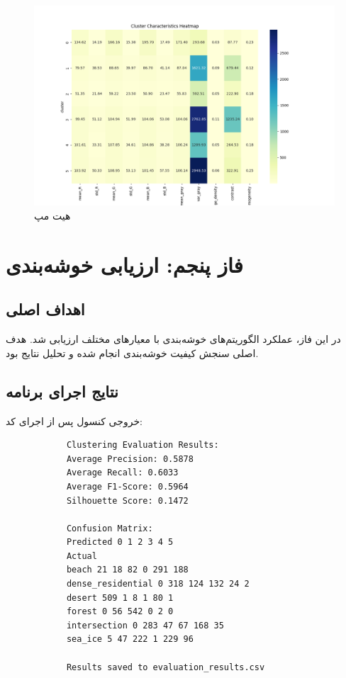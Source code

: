\documentclass[a4paper,12pt]{article}
\let\nobreaksection\section
\renewcommand{\section}{\nobreaksection}
\begin{document}
\clearpage
\begin{figure}[h]
\centering
\includegraphics[width=\textwidth]{cluster_characteristics.png}
\caption{هیت مپ}
\label{fig:hitmap}
\end{figure}

	\section{فاز پنجم: ارزیابی خوشه‌بندی}
	
	\subsection*{\textbf{اهداف اصلی}}
	در این فاز، عملکرد الگوریتم‌های خوشه‌بندی با معیارهای مختلف ارزیابی شد. هدف اصلی سنجش کیفیت خوشه‌بندی انجام شده و تحلیل نتایج بود.
	\subsection*{\textbf{نتایج اجرای برنامه}}
	خروجی کنسول پس از اجرای کد:
	
	\begin{latin}
		\begin{verbatim}
			Clustering Evaluation Results:
			Average Precision: 0.5878
			Average Recall: 0.6033
			Average F1-Score: 0.5964
			Silhouette Score: 0.1472
			
			Confusion Matrix:
			Predicted 0 1 2 3 4 5
			Actual
			beach 21 18 82 0 291 188
			dense_residential 0 318 124 132 24 2
			desert 509 1 8 1 80 1
			forest 0 56 542 0 2 0
			intersection 0 283 47 67 168 35
			sea_ice 5 47 222 1 229 96
			
			Results saved to evaluation_results.csv
		\end{verbatim}
	\end{latin}
\end{document}
